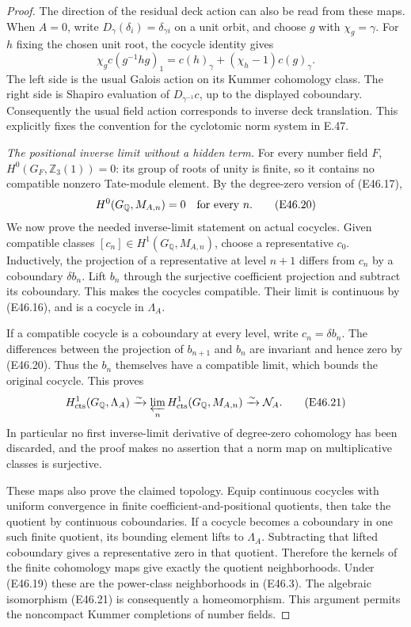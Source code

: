 \begin{proof}
The direction of the residual deck action can
also be read from these maps. When $A=0$, write
$D_\gamma(\delta_i)=\delta_{\gamma i}$ on a unit
orbit, and choose $g$ with $\chi_g=\gamma$.
For $h$ fixing the chosen unit root, the cocycle
identity gives
\[
 \chi_g c(g^{-1}hg)_1
       =c(h)_\gamma+(\chi_h-1)c(g)_\gamma.
\]
The left side is the usual Galois action on its
Kummer cohomology class. The right side is
Shapiro evaluation of $D_{\gamma^{-1}}c$, up
to the displayed coboundary. Consequently the
usual field action corresponds to inverse deck
translation. This explicitly fixes the convention
for the cyclotomic norm system in E.47.

\emph{The positional inverse limit without a hidden term.}
For every number field $F$,
$H^0(G_F,\mathbb Z_3(1))=0$: its group of roots of
unity is finite, so it contains no compatible
nonzero Tate-module element. By the degree-zero
version of (E46.17),
\[
                    H^0(G_{\mathbb Q},M_{A,n})=0
                         \quad\hbox{for every }n.     \tag{E46.20}
\]
We now prove the needed inverse-limit statement
on actual cocycles. Given compatible classes
$[c_n]\in H^1(G_{\mathbb Q},M_{A,n})$, choose a
representative $c_0$. Inductively, the projection
of a representative at level $n+1$ differs from
$c_n$ by a coboundary $\delta b_n$. Lift $b_n$
through the surjective coefficient projection and
subtract its coboundary. This makes the cocycles
compatible. Their limit is continuous by
(E46.16), and is a cocycle in $\Lambda_A$.

If a compatible cocycle is a coboundary at every
level, write $c_n=\delta b_n$. The differences
between the projection of $b_{n+1}$ and $b_n$
are invariant and hence zero by (E46.20).
Thus the $b_n$ themselves have a compatible limit,
which bounds the original cocycle. This proves
\[
 H^1_{\rm cts}(G_{\mathbb Q},\Lambda_A)
    \xrightarrow{\sim}
       \varprojlim_n H^1_{\rm cts}(G_{\mathbb Q},M_{A,n})
    \xrightarrow{\sim}\mathcal N_A.                  \tag{E46.21}
\]
In particular no first inverse-limit derivative of
degree-zero cohomology has been discarded, and the
proof makes no assertion that a norm map on
multiplicative classes is surjective.

These maps also prove the claimed topology. Equip
continuous cocycles with uniform convergence in
finite coefficient-and-positional quotients, then
take the quotient by continuous coboundaries.
If a cocycle becomes a coboundary in one such
finite quotient, its bounding element lifts to
$\Lambda_A$. Subtracting that lifted coboundary
gives a representative zero in that quotient.
Therefore the kernels of the finite cohomology
maps give exactly the quotient neighborhoods.
Under (E46.19) these are the power-class
neighborhoods in (E46.3). The algebraic
isomorphism (E46.21) is consequently a
homeomorphism. This argument permits the
noncompact Kummer completions of number fields.


\end{proof}

